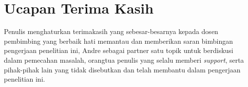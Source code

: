 \section*{Ucapan Terima Kasih}
Penulis menghaturkan terimakasih yang sebesar-besarnya kepada dosen pembimbing yang berbaik hati memantau dan memberikan saran bimbingan pengerjaan penelitian ini, Andre sebagai partner satu topik untuk berdiskusi dalam pemecahan masalah, orangtua penulis yang selalu memberi \textit{support}, serta pihak-pihak lain yang tidak disebutkan dan telah membantu dalam pengerjaan penelitian ini.

\ifCLASSOPTIONcaptionsoff
  \newpage
\fi
